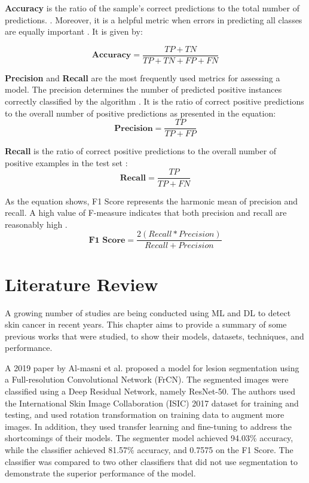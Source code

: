 \documentclass[12pt]{diazessay}
\begin{document}
    \textbf{Accuracy} is the ratio of the sample's correct predictions to the total number of predictions. \cite{app11199296}. Moreover, it is a helpful metric when errors in predicting all classes are equally important \cite{Burkov2019-rd}. It is given by:
    
    \begin{equation*}
       \textbf{Accuracy} = \frac{TP + TN}{TP + TN + FP + FN}
    \end{equation*}
    
    \textbf{Precision} and \textbf{Recall} are the most frequently used metrics for assessing a model. The precision determines the number of predicted positive instances correctly classified by the algorithm \cite{app11199296}. It is the ratio of correct positive predictions to the overall number of positive predictions as presented in the equation:
    \begin{equation*}
        \textbf{Precision} = \frac {TP}  {TP + FP} 
    \end{equation*}
 
    \textbf{Recall} is the ratio of correct positive predictions to the overall number of positive examples in the test set \cite{Burkov2019-rd}:
    \begin{equation*}
        \textbf{Recall} = \frac {TP}  {TP + FN}
    \end{equation*}

    As the equation shows, F1 Score represents the harmonic mean of precision and recall. A high value of F-measure indicates that both precision and recall are reasonably high \cite{app11199296}.
    \begin{equation*}
        \textbf{F1 Score} = \frac {2 (Recall * Precision)}  {Recall + Precision}
    \end{equation*}
    
    \newpage    
    \section{Literature Review}
    \hspace{0.7cm} A growing number of studies are being conducted using ML and DL to detect skin cancer in recent years. This chapter aims to provide a summary of some previous works that were studied, to show their models, datasets, techniques, and performance.
    
    A 2019 paper by Al-masni et al. \cite{Al-masni2019-sj} proposed a model for lesion segmentation using a Full-resolution Convolutional Network (FrCN). The segmented images were classified using a Deep Residual Network, namely ResNet-50. The authors used the International Skin Image Collaboration (ISIC) 2017 dataset for training and testing, and used rotation transformation on training data to augment more images. In addition, they used transfer learning and fine-tuning to address the shortcomings of their models. The segmenter model achieved 94.03\% accuracy, while the classifier achieved 81.57\% accuracy, and 0.7575 on the F1 Score. The classifier was compared to two other classifiers that did not use segmentation to demonstrate the superior performance of the model.
    
\end{document}
